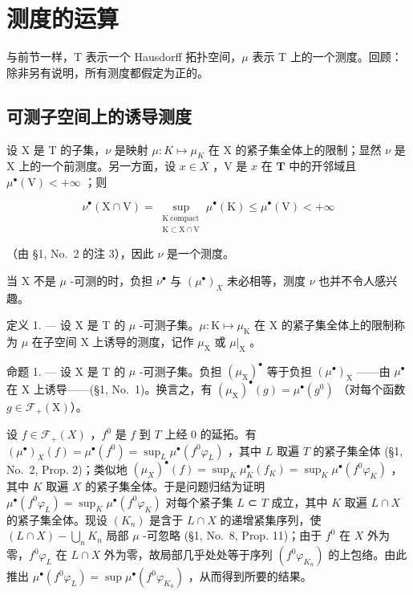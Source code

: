 \section{测度的运算}

与前节一样，T 表示一个 Hausdorff 拓扑空间，\(\mu\) 表示 T 上的一个测度。回顾：除非另有说明，所有测度都假定为正的。

\subsection{可测子空间上的诱导测度}

设 X 是 T 的子集，\(\nu\) 是映射 \(\mu: K \mapsto \mu_{K}\) 在 X 的紧子集全体上的限制；显然 \(\nu\) 是 X 上的一个前测度。另一方面，设 \(x \in X\) ，V 是 \(x\) 在 \(\mathbf{T}\) 中的开邻域且 \(\mu^{\bullet}(\mathrm{V}) < +\infty\) ；则

\[
\nu^{\bullet}(\mathrm{X}\cap \mathrm{V}) = \sup_{\substack{\mathrm{K\ compact}\\ \mathrm{K}\subset \mathrm{X}\cap \mathrm{V}}}\mu^{\bullet}(\mathrm{K})\leqslant \mu^{\bullet}(\mathrm{V}) <   + \infty
\]

（由 §1, No.~2 的注 3），因此 \(\nu\) 是一个测度。

当 X 不是 \(\mu\) -可测的时，负担 \(\nu^{\bullet}\) 与 \((\mu^{\bullet})_{X}\) 未必相等，测度 \(\nu\) 也并不令人感兴趣。

定义 1. --- 设 X 是 T 的 \(\mu\) -可测子集。\(\mu: \mathrm{K} \mapsto \mu_{\mathrm{K}}\) 在 X 的紧子集全体上的限制称为 \(\mu\) 在子空间 X 上诱导的测度，记作 \(\mu_{\mathrm{X}}\) 或 \(\mu|_{\mathrm{X}}\) 。

命题 1. --- 设 X 是 T 的 \(\mu\) -可测子集。负担 \((\mu_{\mathrm{X}})^{\bullet}\) 等于负担 \((\mu^{\bullet})_{\mathrm{X}}\) ——由 \(\mu^{\bullet}\) 在 X 上诱导——(§1, No.~1)。换言之，有 \((\mu_{\mathrm{X}})^{\bullet}(g) = \mu^{\bullet}(g^{0})\) （对每个函数 \(g \in \mathcal{F}_{+}(\mathrm{X})\)）。

设 \(f \in \mathcal{F}_{+}(X)\) ，\(f^{0}\) 是 \(f\) 到 \(T\) 上经 0 的延拓。有 \((\mu^{\bullet})_{X}(f) = \mu^{\bullet}(f^{0}) = \sup_{L} \mu^{\bullet}(f^{0}\varphi_{L})\) ，其中 \(L\) 取遍 \(T\) 的紧子集全体 (§1, No.~2, Prop. 2)；类似地 \((\mu_{X})^{\bullet}(f) = \sup_{K} \mu_{K}^{\bullet}(f_{K}) = \sup_{K} \mu^{\bullet}(f^{0}\varphi_{K})\) ，其中 \(K\) 取遍 \(X\) 的紧子集全体。于是问题归结为证明 \(\mu^{\bullet}(f^{0}\varphi_{L}) = \sup_{K} \mu^{\bullet}(f^{0}\varphi_{K})\) 对每个紧子集 \(L\) ⊂ \(T\) 成立，其中 \(K\) 取遍 \(L \cap X\) 的紧子集全体。现设 \((K_{n})\) 是含于 \(L \cap X\) 的递增紧集序列，使 \((L \cap X) - \bigcup_{n} K_{n}\) 局部 \(\mu\) -可忽略 (§1, No.~8, Prop. 11)；由于 \(f^{0}\) 在 \(X\) 外为零，\(f^{0}\varphi_{L}\) 在 \(L \cap X\) 外为零，故局部几乎处处等于序列 \((f^{0}\varphi_{K_{n}})\) 的上包络。由此推出 \(\mu^{\bullet}(f^{0}\varphi_{L}) = \sup \mu^{\bullet}(f^{0}\varphi_{K_{n}})\) ，从而得到所要的结果。

